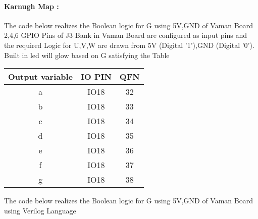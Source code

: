 \documentclass[10pt, a4paper]{article}
\begin{document}
    \paragraph{Karnugh Map :}

The code below realizes the Boolean logic for G  using 5V,GND of Vaman Board
\\
2,4,6 GPIO Pins of J3 Bank in Vaman Board are configured as input pins and the required Logic for U,V,W are drawn from 5V (Digital '1'),GND (Digital '0'). Built in led will glow based on G satisfying the Table\\

\begin{center}
\begin{tabular}{|c|c|c|}
\hline
\textbf{Output variable}&\textbf{IO PIN}&\textbf{QFN}\\
\hline
a & IO18 &32\\  
\hline
\hline
b & IO18 &33\\  
\hline
\hline
c & IO18 &34\\  
\hline
\hline
d & IO18 &35\\  
\hline
\hline
e & IO18 &36\\  
\hline
\hline
f & IO18 &37\\  
\hline
\hline
g & IO18 &38\\  
\hline

\end{tabular}
\end{center}
The code below realizes the Boolean logic for G  using 5V,GND of Vaman Board using Verilog Language
\begin{center}
\end{center}
\end{document}
